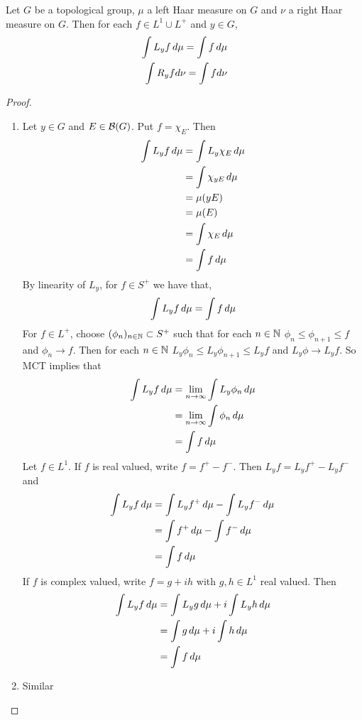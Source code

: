 \documentclass{book}
\begin{document}
	\begin{ex}  
		Let $G$ be a topological group, $\mu$ a left Haar measure on $G$ and $\nu$ a right Haar measure on $G$. Then for each $f \in L^1 \cup L^+$ and $y \in G$, 
		\begin{align}
			\int L_y f \, d \mu = \int f \, d \mu \\
			\int R_y f d\nu = \int f d\nu
		\end{align}
	\end{ex}
	
	\begin{proof}\
		\begin{enumerate}
			\item Let $y \in G$ and $E \in \mathcal{B}(G)$. Put $f = \chi_E$. Then 
			\begin{align*}
				\int L_y f \, d \mu 
				& = \int L_y\chi_E \, d \mu \\
				& =  \int \chi_{yE} \, d \mu \\
				& = \mu(yE) \\
				& = \mu(E) \\
				& = \int \chi_E \, d \mu \\
				& = \int f \, d \mu
			\end{align*} 
			By linearity of $L_y$, for $f \in S^+$ we have that, $$\int L_y f \, d \mu = \int f \, d \mu$$ For $f \in L^+$, choose $(\phi_{n})_{n \in \mathbb{N}} \subset S^+$ such that for each $n \in \mathbb{N}$ $\phi_n \leq \phi_{n+1} \leq f$ and $\phi_n \rightarrow f$. Then for each $n \in \mathbb{N}$ $L_y \phi_n \leq L_y \phi_{n+1} \leq L_y f$ and $L_y \phi \rightarrow L_y f$. So MCT implies that 
			\begin{align*}
				\int L_y f \, d \mu 
				& = \lim \limits_{n \rightarrow \infty} \int L_y \phi_n \, d \mu \\
				& = \lim \limits_{n \rightarrow \infty} \int \phi_n \, d \mu \\
				& = \int f \, d \mu \\
			\end{align*}
			Let $f \in L^1$. If $f$ is real valued, write $f = f^+ - f^-$. Then $L_y f = L_y f^+ - L_y f^-$ and 
			\begin{align*}
				\int L_yf \, d \mu 
				& = \int L_y f^+ \, d \mu - \int L_y f^- \, d \mu \\
				& = \int f^+ \, d \mu - \int f^- \, d \mu \\
				& = \int f \, d \mu
			\end{align*}
			If $f$ is complex valued, write $f = g + ih$ with $g, h \in L^1$ real valued. Then 
			\begin{align*}
				\int L_yf \, d \mu 
				& = \int L_y g \, d \mu + i \int L_y h \, d \mu \\
				& = \int g \, d \mu +i \int h \, d \mu \\
				& = \int f \, d \mu
			\end{align*}
			\item Similar
		\end{enumerate}
	\end{proof}
	
\end{document}
